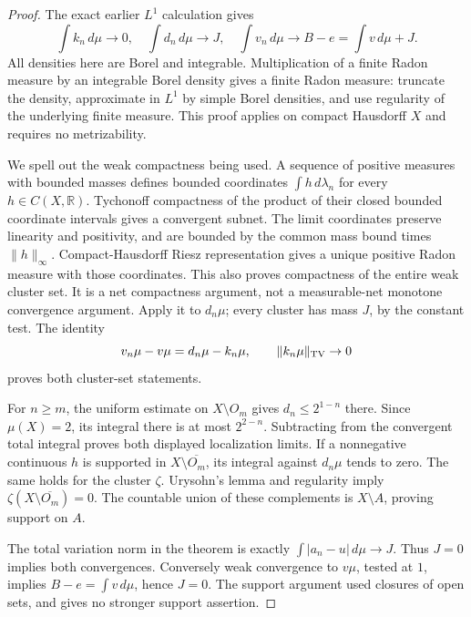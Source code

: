\documentclass[11pt]{article}
\begin{document}
\begin{proof}
The exact earlier $L^1$ calculation gives
\[
 \int k_n\,d\mu\to0,\quad \int d_n\,d\mu\to J,
 \quad \int v_n\,d\mu\to B-e=\int v\,d\mu+J.
\]
All densities here are Borel and integrable. Multiplication of a finite
Radon measure by an integrable Borel density gives a finite Radon measure:
truncate the density, approximate in $L^1$ by simple Borel densities,
and use regularity of the underlying finite measure. This proof applies
on compact Hausdorff $X$ and requires no metrizability.

We spell out the weak compactness being used. A sequence of positive
measures with bounded masses defines bounded coordinates
$\int h\,d\lambda_n$ for every $h\in C(X,\mathbb R)$. Tychonoff
compactness of the product of their closed bounded coordinate intervals
gives a convergent subnet. The limit coordinates preserve linearity and
positivity, and are bounded by the common mass bound times
$\|h\|_\infty$. Compact-Hausdorff Riesz representation gives a unique
positive Radon measure with those coordinates. This also proves
compactness of the entire weak cluster set. It is a net compactness
argument, not a measurable-net monotone convergence argument.
Apply it to $d_n\mu$; every cluster has mass $J$, by the constant test.
The identity
\[
 v_n\mu-v\mu=d_n\mu-k_n\mu,
 \qquad\|k_n\mu\|_{\rm TV}\to0
\]
proves both cluster-set statements.

For $n\ge m$, the uniform estimate on $X\setminus O_m$ gives
$d_n\le 2^{1-n}$ there. Since $\mu(X)=2$, its integral there is
at most $2^{2-n}$. Subtracting from the convergent total integral proves
both displayed localization limits. If a nonnegative continuous $h$ is
supported in $X\setminus\overline{O_m}$, its integral against
$d_n\mu$ tends to zero. The same holds for the cluster $\zeta$.
Urysohn's lemma and regularity imply
$\zeta(X\setminus\overline{O_m})=0$. The countable union of these
complements is $X\setminus A$, proving support on $A$.

The total variation norm in the theorem is exactly
$\int|a_n-u|\,d\mu\to J$. Thus $J=0$ implies both convergences.
Conversely weak convergence to $v\mu$, tested at $1$, implies
$B-e=\int v\,d\mu$, hence $J=0$. The support argument used closures
of open sets, and gives no stronger support assertion.
\end{proof}
\end{document}
